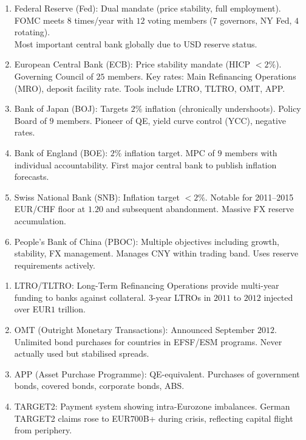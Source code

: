 \documentclass[a4paper,oneside,openany]{book}
\begin{document}
\begin{remark} 
\begin{enumerate}[label=\roman*.]
\setlength{\itemsep}{0pt}
\item Federal Reserve (Fed): Dual mandate (price stability, full employment). FOMC meets $8$ times/year with $12$ voting members ($7$ governors, NY Fed, $4$ rotating).\\
Most important central bank globally due to USD reserve status.
\item European Central Bank (ECB): Price stability mandate (HICP $<2\%$). Governing Council of $25$ members. Key rates: Main Refinancing Operations (MRO), deposit facility rate. Tools include LTRO, TLTRO, OMT, APP.
\item Bank of Japan (BOJ): Targets $2\%$ inflation (chronically undershoots). Policy Board of $9$ members. Pioneer of QE, yield curve control (YCC), negative rates.
\item Bank of England (BOE): $2\%$ inflation target. MPC of $9$ members with individual accountability. First major central bank to publish inflation forecasts.
\item Swiss National Bank (SNB): Inflation target $<2\%$. Notable for 2011--2015 EUR/CHF floor at $1.20$ and subsequent abandonment. Massive FX reserve accumulation.
\item People's Bank of China (PBOC): Multiple objectives including growth, stability, FX management. Manages CNY within trading band. Uses reserve requirements actively.
\end{enumerate}
\end{remark}

\begin{remark} 
\begin{enumerate}[label=\roman*.]
\setlength{\itemsep}{0pt}
\item LTRO/TLTRO: Long-Term Refinancing Operations provide multi-year funding to banks against collateral. $3$-year LTROs in $2011$ to $2012$ injected over EUR$1$ trillion.
\item OMT (Outright Monetary Transactions): Announced September $2012$. Unlimited bond purchases for countries in EFSF/ESM programs. Never actually used but stabilised spreads.
\item APP (Asset Purchase Programme): QE-equivalent. Purchases of government bonds, covered bonds, corporate bonds, ABS.
\item TARGET2: Payment system showing intra-Eurozone imbalances. German TARGET2 claims rose to EUR$700$B+ during crisis, reflecting capital flight from periphery.
\end{enumerate}
\end{remark}
\end{document}
